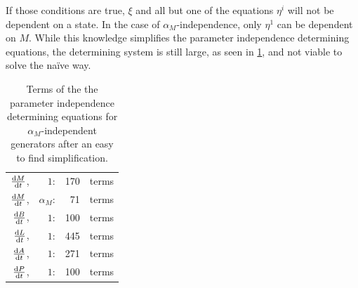 If those conditions are true, \(\xi\) and all but one of the equations \(\eta^i\) will not be dependent on a state.
In the case of \(\alpha_M\)-independence, only \(\eta^1\) can be dependent on \(M\).
While this knowledge simplifies the parameter independence determining equations, the determining system is still large, as seen in \cref{tab:lac-operon-parameter-independence-terms-simplified}, and not viable to solve the naïve way.
\begin{table}
  \centering
  \begin{tabular}{r@{ }rr@{ }l}
    \(\diff{M}{t}\),& \(1\):& 170& terms \\
    \(\diff{M}{t}\),& \(\alpha_M\):& 71& terms \\
    \(\diff{B}{t}\),& \(1\):& 100& terms \\
    \(\diff{L}{t}\),& \(1\):& 445& terms \\
    \(\diff{A}{t}\),& \(1\):& 271& terms \\
    \(\diff{P}{t}\),& \(1\):& 100& terms
  \end{tabular}
  \caption{Terms of the the parameter independence determining equations for \(\alpha_M\)-independent generators after an easy to find simplification.}
  \label{tab:lac-operon-parameter-independence-terms-simplified}
\end{table}
